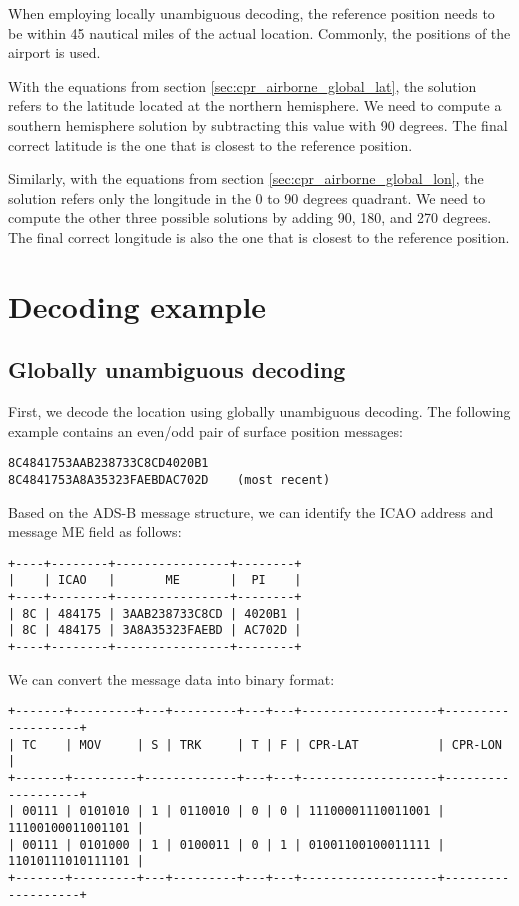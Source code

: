 When employing locally unambiguous decoding, the reference position needs to be within 45 nautical miles of the actual location. Commonly, the positions of the airport is used.

With the equations from section \ref{sec:cpr_airborne_global_lat}, the solution refers to the latitude located at the northern hemisphere. We need to compute a southern hemisphere solution by subtracting this value with 90 degrees. The final correct latitude is the one that is closest to the reference position.

Similarly, with the equations from section \ref{sec:cpr_airborne_global_lon}, the solution refers only the longitude in the 0 to 90 degrees quadrant. We need to compute the other three possible solutions by adding 90, 180, and 270 degrees. The final correct longitude is also the one that is closest to the reference position.




\section{Decoding example}

\subsection{Globally unambiguous decoding}

First, we decode the location using globally unambiguous decoding. The following example contains an even/odd pair of surface position messages: 

\begin{verbatim}
8C4841753AAB238733C8CD4020B1
8C4841753A8A35323FAEBDAC702D    (most recent)
\end{verbatim}

Based on the ADS-B message structure, we can identify the ICAO address and message ME field as follows:

\begin{verbatim}
+----+--------+----------------+--------+
|    | ICAO   |       ME       |  PI    |
+----+--------+----------------+--------+
| 8C | 484175 | 3AAB238733C8CD | 4020B1 |
| 8C | 484175 | 3A8A35323FAEBD | AC702D |
+----+--------+----------------+--------+
\end{verbatim}

We can convert the message data into binary format:

\begin{verbatim}
+-------+---------+---+---------+---+---+-------------------+-------------------+
| TC    | MOV     | S | TRK     | T | F | CPR-LAT           | CPR-LON           |
+-------+---------+-------------+---+---+-------------------+-------------------+
| 00111 | 0101010 | 1 | 0110010 | 0 | 0 | 11100001110011001 | 11100100011001101 |
| 00111 | 0101000 | 1 | 0100011 | 0 | 1 | 01001100100011111 | 11010111010111101 |
+-------+---------+---+---------+---+---+-------------------+-------------------+
\end{verbatim}


